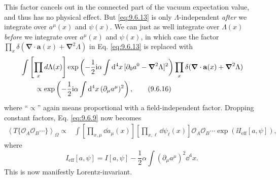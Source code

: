This factor cancels out in the connected part of the vacuum expectation value,
and thus has no physical effect. But \eqref{eq:9.6.13} is only $\Lambda$-independent
\emph{after} we integrate over $a^\mu(x)$ and $\psi(x)$. We can just as well
integrate over $\Lambda(x)$ \emph{before} we integrate over $a^\mu(x)$ and
$\psi(x)$, in which case the factor
$\prod_x\delta(\boldsymbol\nabla\cdot\mathbf a(x)
+\boldsymbol\nabla^2\Lambda)$ in Eq. \eqref{eq:9.6.13} is replaced with
\begin{align}
&\int\left[\prod_xd\Lambda(x)\right]
 \exp\left(-\frac12\mathrm{i}\alpha\int \mathop{}\!\mathrm{d}^4x\,
 [\partial_0a^0-\boldsymbol\nabla^2\Lambda]^2\right)
 \prod_x\delta(\boldsymbol\nabla\cdot\mathbf a(x)
 +\boldsymbol\nabla^2\Lambda)
\notag\\
&\qquad\propto\exp\left(-\frac12\mathrm{i}\alpha\int \mathop{}\!\mathrm{d}^4x\,
 (\partial_\mu a^\mu)^2\right),
\tag{9.6.16}\label{eq:9.6.16}
\end{align}
where ``$\propto$'' again means proportional with a field-independent factor.
Dropping constant factors, Eq. \eqref{eq:9.6.9} now becomes
\begin{align}
\left\langle T\{\mathcal O_A\mathcal O_B\cdots\}\right\rangle_{\Omega}
\propto{}&\int\left[\prod_{x,\mu}\dd a_\mu(x)\right]
 \left[\prod_{x,\ell}\dd\psi_\ell(x)\right]
 \mathcal O_A\mathcal O_B\cdots\exp(\ii I_{\mathrm{eff}}[a,\psi]),
\tag{9.6.17}\label{eq:9.6.17}
\end{align}
where
\begin{equation}
I_{\mathrm{eff}}[a,\psi]=I[a,\psi]
 -\frac12\alpha\int(\partial_\mu a^\mu)^2\dd^4x.
\tag{9.6.18}\label{eq:9.6.18}
\end{equation}
This is now manifestly Lorentz-invariant.

